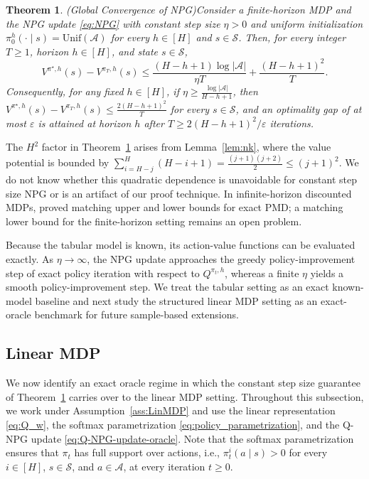 \documentclass[11pt]{article}
\newtheorem{thm}{Theorem}
\begin{document}
\begin{thm}(Global Convergence of NPG)\label{thm:GC}
Consider a finite-horizon MDP and the NPG update \eqref{eq:NPG} with constant
step size $\eta>0$ and uniform initialization
$\pi_0^h(\cdot\mid s)=\mathrm{Unif}(\mathcal{A})$\; for every $h\in[H]$ and
$s\in\mathcal{S}$. Then, for every integer $T\ge1$, horizon $h\in[H]$, and
state $s\in\mathcal{S}$,
\[
V^{\pi^\star,h}(s)-V^{\pi_T,h}(s)
\le
\frac{(H-h+1)\log|\mathcal{A}|}{\eta T}
+
\frac{(H-h+1)^2}{T}.
\]
Consequently, for any fixed $h\in[H]$, if
$\eta\ge\frac{\log|\mathcal{A}|}{H-h+1}$, then
$V^{\pi^\star,h}(s)-V^{\pi_T,h}(s)\le\frac{2(H-h+1)^2}{T}$ for every
$s\in\mathcal{S}$, and an optimality gap of at most $\varepsilon$ is attained
at horizon $h$ after $T\ge 2(H-h+1)^2/\varepsilon$ iterations.
\end{thm}
The $H^2$ factor in Theorem~\ref{thm:GC} arises from
Lemma~\ref{lem:nk}, where the value potential is bounded by
$\sum_{i=H-j}^H(H-i+1)=\frac{(j+1)(j+2)}{2}\le(j+1)^2$. We do not know
whether this quadratic dependence is unavoidable for constant step size NPG
or is an artifact of our proof technique. In infinite-horizon discounted
MDPs, \citet{johnson2023optimal} proved matching upper and lower bounds for
exact PMD; a matching lower bound for the finite-horizon setting remains an
open problem.


Because the tabular model is known, its action-value functions can be
evaluated exactly. As $\eta\to\infty$, the NPG update approaches the greedy policy-improvement
step of exact policy iteration with respect to $Q^{\pi_t,h}$, whereas a finite
$\eta$ yields a smooth policy-improvement step. We treat the tabular setting as an exact
known-model baseline and next study the structured linear MDP setting as an
exact-oracle benchmark for future sample-based extensions.

\subsection{Linear MDP} \label{sec:linear}

We now identify an exact oracle regime in which the constant step size
guarantee of Theorem~\ref{thm:GC} carries over to the linear MDP setting.
Throughout this subsection, we work under Assumption~\ref{ass:LinMDP} and use
the linear representation \eqref{eq:Q_w}, the softmax parametrization
\eqref{eq:policy_parametrization}, and the Q-NPG update
\eqref{eq:Q-NPG-update-oracle}. Note that the softmax parametrization ensures
that $\pi_t$ has full support over actions, i.e., $\pi_t^i(a\mid s)>0$ for
every $i\in[H]$, $s\in\mathcal S$, and $a\in\mathcal A$, at every iteration
$t\ge0$.
\end{document}
